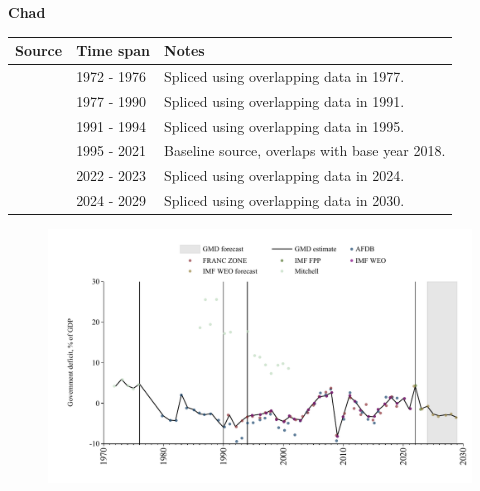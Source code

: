 \documentclass[12pt,a4paper,landscape]{article}
\begin{document}
\begin{adjustbox}{max totalsize={\paperwidth}{\paperheight},center}
\begin{minipage}[t][\textheight][t]{\textwidth}
\vspace*{0.5cm}
{}
\begin{center}
{\Large\bfseries Chad}
\end{center}
\vspace{0.5cm}
\begin{table}[H]
\centering
\small
\begin{tabular}{|l|l|l|}
\hline
\textbf{Source} & \textbf{Time span} & \textbf{Notes} \\
\hline
\rowcolor{white}\cite{Mitchell}& 1972 - 1976 &Spliced using overlapping data in 1977.\\
\rowcolor{lightgray}\cite{AFDB}& 1977 - 1990 &Spliced using overlapping data in 1991.\\
\rowcolor{white}\cite{FRANC_ZONE}& 1991 - 1994 &Spliced using overlapping data in 1995.\\
\rowcolor{lightgray}\cite{IMF_WEO}& 1995 - 2021 &Baseline source, overlaps with base year 2018.\\
\rowcolor{white}\cite{IMF_FPP}& 2022 - 2023 &Spliced using overlapping data in 2024.\\
\rowcolor{lightgray}\cite{IMF_WEO_forecast}& 2024 - 2029 &Spliced using overlapping data in 2030.\\
\hline
\end{tabular}
\end{table}
\begin{figure}[H]
\centering
\includegraphics[width=\textwidth,height=0.6\textheight,keepaspectratio]{graphs/TCD_govdef_GDP.pdf}
\end{figure}
\end{minipage}
\end{adjustbox}
\end{document}
